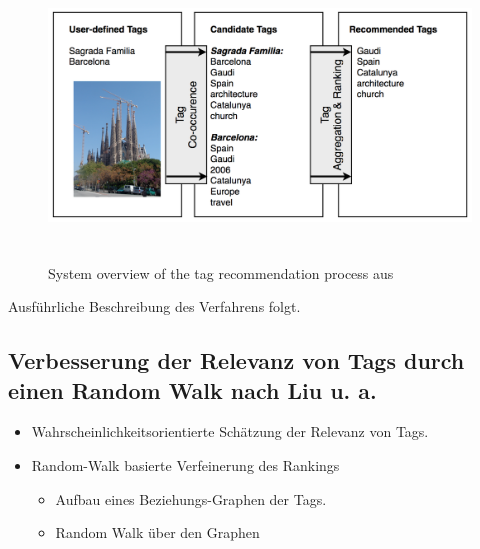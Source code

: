 \begin{figure}[htbp]
  \centering
    \includegraphics[height=3in]{images/collective_knowledge_system_overview.png}
  \caption{System overview of the tag recommendation process aus \cite{collectiveKnowledge}}
  \label{fig:images_collective_knowledge_system_overview}
\end{figure}


Ausführliche Beschreibung des Verfahrens folgt.


\subsection{Verbesserung der Relevanz von Tags durch einen Random Walk nach Liu u. a.} %
\label{sub:verbesserung_der_relevanz_durch_einen_random_walk}

\begin{itemize}
  \item Wahrscheinlichkeitsorientierte Schätzung der Relevanz von Tags.
  \item Random-Walk basierte Verfeinerung des Rankings
    
    \begin{itemize}
      \item Aufbau eines Beziehungs-Graphen der Tags.
      \item Random Walk über den Graphen
    \end{itemize}
\end{itemize}

